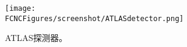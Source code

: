 \begin{figure}[htb]
\centering
\texttt{[image: \\FCNCFigures/screenshot/ATLASdetector.png]}
\caption{ATLAS探测器。}
\label{fig:ATLASdetector}
\end{figure}